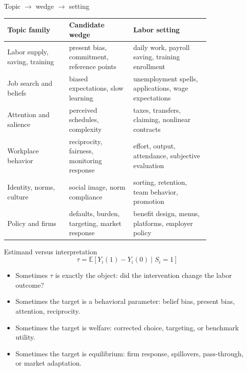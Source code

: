 \documentclass[aspectratio=169,11pt]{beamer}
\begin{document}
\begin{frame}{Topic $\rightarrow$ wedge $\rightarrow$ setting}
\small
\begin{tabular}{p{0.25\linewidth} p{0.26\linewidth} p{0.31\linewidth}}
\toprule
Topic family & Candidate wedge & Labor setting \\
\midrule
Labor supply, saving, training & present bias, commitment, reference points & daily work, payroll saving, training enrollment \\
Job search and beliefs & biased expectations, slow learning & unemployment spells, applications, wage expectations \\
Attention and salience & perceived schedules, complexity & taxes, transfers, claiming, nonlinear contracts \\
Workplace behavior & reciprocity, fairness, monitoring response & effort, output, attendance, subjective evaluation \\
Identity, norms, culture & social image, norm compliance & sorting, retention, team behavior, promotion \\
Policy and firms & defaults, burden, targeting, market response & benefit design, menus, platforms, employer policy \\
\bottomrule
\end{tabular}
\end{frame}

\begin{frame}{Estimand versus interpretation}
\[
\tau = \mathbb{E}[Y_i(1)-Y_i(0) \mid S_i=1]
\]

\begin{itemize}
    \item Sometimes $\tau$ is exactly the object: did the intervention change the labor outcome?
    \item Sometimes the target is a behavioral parameter: belief bias, present bias, attention, reciprocity.
    \item Sometimes the target is welfare: corrected choice, targeting, or benchmark utility.
    \item Sometimes the target is equilibrium: firm response, spillovers, pass-through, or market adaptation.
\end{itemize}
\end{frame}
\end{document}
